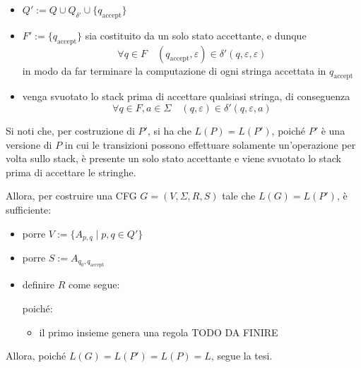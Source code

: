 \documentclass[a4paper, 12pt]{report}
\begin{document}
{\begin{itemize}
\begin{figure}[H]
                \end{figure}

                e sia $Q_{\delta'}$ l'insieme di stati tali da permettere la non simultaneità appena descritta
            \item $Q' := Q \cup Q_{\delta '} \cup \{q_\mathrm{accept}\}$
            \item $F' := \{q_\mathrm{accept}\}$ sia costituito da un solo stato accettante, e dunque $$\forall q \in F \quad (q_\mathrm{accept}, \varepsilon) \in \delta'(q, \varepsilon, \varepsilon)$$ in modo da far terminare la computazione di ogni stringa accettata in $q_\mathrm{accept}$
            \item venga svuotato lo stack prima di accettare qualsiasi stringa, di conseguenza $$\forall q \in F, a \in \Sigma \quad (q, \varepsilon) \in \delta'(q, \varepsilon, a)$$
        \end{itemize}

        Si noti che, per costruzione di $P'$, si ha che $L(P) = L(P')$, poiché $P'$ è una versione di $P$ in cui le transizioni possono effettuare solamente un'operazione per volta sullo stack, è presente un solo stato accettante e viene svuotato lo stack prima di accettare le stringhe.

        Allora, per costruire una CFG $G = (V, \Sigma, R, S)$ tale che $L(G) = L(P')$, è sufficiente:

        \begin{itemize}
            \item porre $V := \{A_{p,q} \mid p, q \in Q'\}$
            \item porre $S := A_{q_0, q_\mathrm{accept}}$
            \item definire $R$ come segue: 

                poiché:

                \begin{itemize}
                    \item il primo insieme genera una regola TODO DA FINIRE 
                \end{itemize}
        \end{itemize}

        Allora, poiché $L(G) = L(P') = L(P) = L$, segue la tesi.
    }
\end{document}
